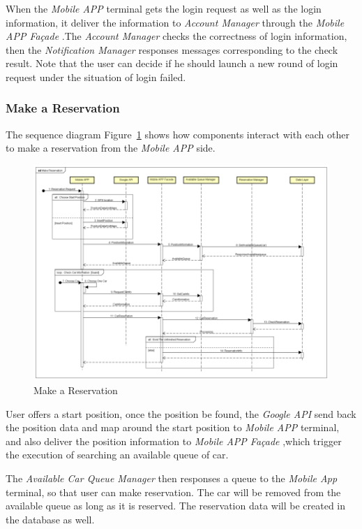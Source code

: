 \documentclass[a4paper,11pt]{article}
\begin{document}
When the \textsl{Mobile APP} terminal gets the login request as well as the login information, it deliver the information to \textsl{Account Manager} through the \textsl{Mobile APP Façade} .The \textsl{Account Manager} checks the correctness of login information, then the \textsl{Notification Manager} responses messages corresponding to the check result. Note that the user can decide if he should launch a new round of login request under the situation of login failed. 
		
		\subsubsection{Make a Reservation}
The sequence diagram Figure~\ref{fig-makeres} shows how components interact with each other to make a reservation from the \textsl{Mobile APP} side.
		
		\begin{figure}[H]
   			\centering
   			\includegraphics[width=\textwidth]{images/make_an_reservation_SD}
  	    		\caption{Make a Reservation}\label{fig-makeres}
		\end{figure}
		
User offers a start position, once the position be found, the \textsl{Google API} send back the position data and map around the start position to \textsl{Mobile APP} terminal, and also deliver the position information to \textsl{Mobile APP Façade} ,which trigger the execution of searching an available queue of car.

The \textsl{Available Car Queue Manager} then responses a queue to the \textsl{Mobile App} terminal, so that user can make reservation. The car will be removed from the available queue as long as it is reserved. The reservation data will be created in the database as well.
\end{document}
